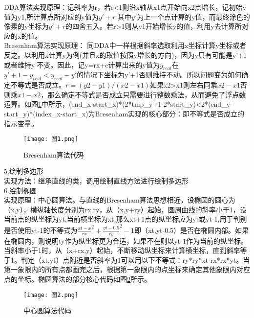 \documentclass[a4paper,UTF8]{article}
\theoremstyle{definition}
\begin{document}
\indent{}DDA算法实现原理：记斜率为r，若r<1则沿x轴从x1点开始向x2点增长，记初始y值为y1,所计算点所对应的y值为$y'+r$ 其中$y'$为上一个点计算的y值，而最终涂色的像素的y坐标为$y'+r$的四舍五入。若r>1则从y1开始增长y的值，利用y去计算所对应的x的值。\\
\indent{}Bresenham算法实现原理：
同DDA中一样根据斜率选取利用x坐标计算y坐标或者反之。以利用x计算y为例(并且x的取值按照y增长的方向)，因为y只有可能是y'+1或者维持y'不变。因此，记y=rx+c计算出来的y值为$y_{real}$在$y'+1-y_{real}<y_{real}-y'$的情况下坐标为y'+1否则维持不动。所以问题变为如何确定不等式是否成立。$r=(y2-y1)/(x2-x1)$如果x2>x1则左右同乘$x2-x1$否则乘$x1-x2$，那么确定不等式是否成立只需要进行整数乘法，从而避免了浮点数运算。如图\ref{fig:图1}中所示，(end\_x-start\_x)*(2*tmp\_y+1-2*start\_y)<2*(end\_y-start\_y)*(index\_x-start\_x)为Bresenham实现的核心部分：即不等式是否成立的指示变量。\\

\begin{figure}[htbp]
   \centering
   \texttt{[image: 图1.png]} %
   \caption{Bresenham算法代码}
   \label{fig:图1}
\end{figure}

\noindent{}5.绘制多边形\\

\indent{}实现方法：继承直线的类，调用绘制直线方法进行绘制多边形\\

\noindent{}6.绘制椭圆\\

\indent{}实现原理：中心圆算法。与直线的Bresenham算法思想相近，设椭圆的圆心为（x,y），横纵轴长度分别为rx,ry，从（x,y+ry）起始，圆周曲线的斜率小于1，设当前点的纵坐标为yt,当前横坐标为xt,那么xt+1点的纵坐标应为yt或yt-1,用于判别是否使用yt-1的不等式为${\frac{xt-x}{rx}^2+{\frac{yt-0.5}{ry}}^2-1}$即（xt,yt-0.5）是否在椭圆内部。如果在椭圆内，则说明ty作为纵坐标更为合适，如果不在则以yt-1作为当前的纵坐标。当斜率小于1时，从（x+rx,y）起始，不断移动纵坐标来计算横坐标，直到斜率等于1。判定（xt,yt）点附近是否斜率为1可以用以下不等式：ry*ry*xt-rx*rx*yt。当第一象限内的所有点都画完之后，根据第一象限内的点坐标来确定其他象限内对应点的坐标。椭圆算法的部分核心代码如图\ref{fig:图2}所示。\\


\begin{figure}[htbp]
   \centering
   \texttt{[image: 图2.png]} %
   \caption{中心圆算法代码}
   \label{fig:图2}
\end{figure}
\end{document}
